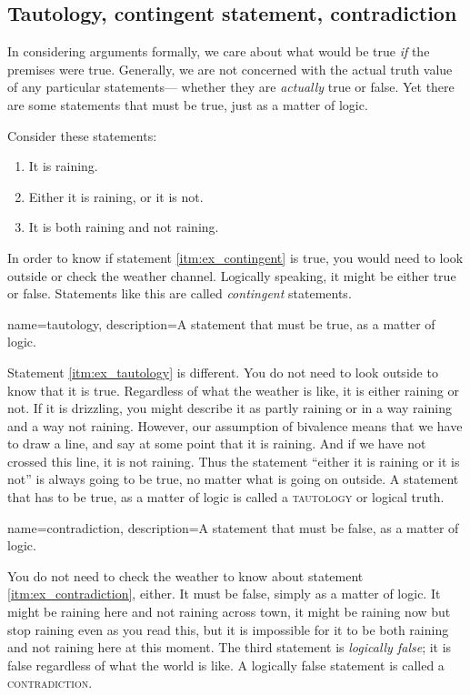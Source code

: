 \subsection{Tautology, contingent statement, contradiction}

In considering arguments formally, we care about what would be true \emph{if} the premises were true. Generally, we are not concerned with the actual truth value of any particular statements--- whether they are \emph{actually} true or false. Yet there are some statements that must be true, just as a matter of logic.

Consider these statements:
\begin{enumerate}[label=(\alph*)]
\item \label{itm:ex_contingent} It is raining.
\item \label{itm:ex_tautology} Either it is raining, or it is not.
\item \label{itm:ex_contradiction} It is both raining and not raining.
\end{enumerate}
In order to know if statement \ref{itm:ex_contingent} is true, you would need to look outside or check the weather channel. Logically speaking, it might be either true or false. Statements like this are called \emph{contingent} statements.


{
name=tautology,
description={A statement that must be true, as a matter of logic.}
}

Statement \ref{itm:ex_tautology} is different. You do not need to look outside to know that it is true. Regardless of what the weather is like, it is either raining or not. If it is drizzling, you might describe it as partly raining or in a way raining and a way not raining. However, our assumption of bivalence means that we have to draw a line, and say at some point that it is raining. And if we have not crossed this line, it is not raining. Thus the statement ``either it is raining or it is not'' is always going to be true, no matter what is going on outside. A statement that has to be true, as a matter of logic is called a \textsc{\gls{tautology}} \label{def:tautology} or logical truth. 

{
name=contradiction,
description={A statement that must be false, as a matter of logic.}
}

You do not need to check the weather to know about statement \ref{itm:ex_contradiction}, either. It must be false, simply as a matter of logic. It might be raining here and not raining across town, it might be raining now but stop raining even as you read this, but it is impossible for it to be both raining and not raining here at this moment. The third statement is \emph{logically false}; it is false regardless of what the world is like. A logically false statement is called a \textsc{\gls{contradiction}}. \label{def:contradiction}

